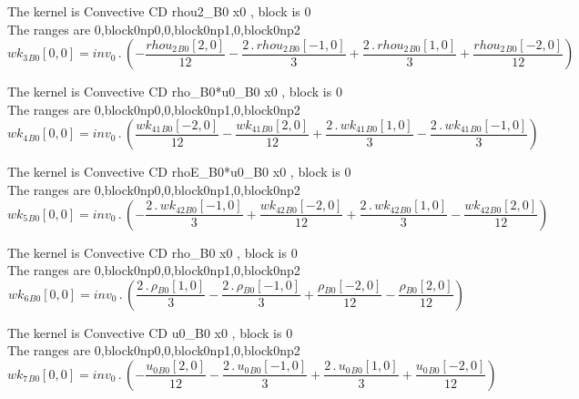 \documentclass{article}
\begin{document}
\noindent The kernel is Convective CD rhou2_B0 x0 , block is 0\\\noindent The ranges are 0,block0np0,0,block0np1,0,block0np2\\\begin{dmath}{wk_{3}{_{B0}}}[{0,0}] = inv_0 \,.\, \left(- \frac{{rhou_{2}{_{B0}}}[{2,0}]}{12} - \frac{2 \,.\, {rhou_{2}{_{B0}}}[{-1,0}]}{3} + \frac{2 \,.\, {rhou_{2}{_{B0}}}[{1,0}]}{3} + \frac{{rhou_{2}{_{B0}}}[{-2,0}]}{12}\right)\end{dmath}

\noindent The kernel is Convective CD rho_B0*u0_B0 x0 , block is 0\\\noindent The ranges are 0,block0np0,0,block0np1,0,block0np2\\\begin{dmath}{wk_{4}{_{B0}}}[{0,0}] = inv_0 \,.\, \left(\frac{{wk_{41}{_{B0}}}[{-2,0}]}{12} - \frac{{wk_{41}{_{B0}}}[{2,0}]}{12} + \frac{2 \,.\, {wk_{41}{_{B0}}}[{1,0}]}{3} - \frac{2 \,.\, {wk_{41}{_{B0}}}[{-1,0}]}{3}\right)\end{dmath}

\noindent The kernel is Convective CD rhoE_B0*u0_B0 x0 , block is 0\\\noindent The ranges are 0,block0np0,0,block0np1,0,block0np2\\\begin{dmath}{wk_{5}{_{B0}}}[{0,0}] = inv_0 \,.\, \left(- \frac{2 \,.\, {wk_{42}{_{B0}}}[{-1,0}]}{3} + \frac{{wk_{42}{_{B0}}}[{-2,0}]}{12} + \frac{2 \,.\, {wk_{42}{_{B0}}}[{1,0}]}{3} - \frac{{wk_{42}{_{B0}}}[{2,0}]}{12}\right)\end{dmath}

\noindent The kernel is Convective CD rho_B0 x0 , block is 0\\\noindent The ranges are 0,block0np0,0,block0np1,0,block0np2\\\begin{dmath}{wk_{6}{_{B0}}}[{0,0}] = inv_0 \,.\, \left(\frac{2 \,.\, {\rho{_{B0}}}[{1,0}]}{3} - \frac{2 \,.\, {\rho{_{B0}}}[{-1,0}]}{3} + \frac{{\rho{_{B0}}}[{-2,0}]}{12} - \frac{{\rho{_{B0}}}[{2,0}]}{12}\right)\end{dmath}

\noindent The kernel is Convective CD u0_B0 x0 , block is 0\\\noindent The ranges are 0,block0np0,0,block0np1,0,block0np2\\\begin{dmath}{wk_{7}{_{B0}}}[{0,0}] = inv_0 \,.\, \left(- \frac{{u_{0}{_{B0}}}[{2,0}]}{12} - \frac{2 \,.\, {u_{0}{_{B0}}}[{-1,0}]}{3} + \frac{2 \,.\, {u_{0}{_{B0}}}[{1,0}]}{3} + \frac{{u_{0}{_{B0}}}[{-2,0}]}{12}\right)\end{dmath}
\end{document}
